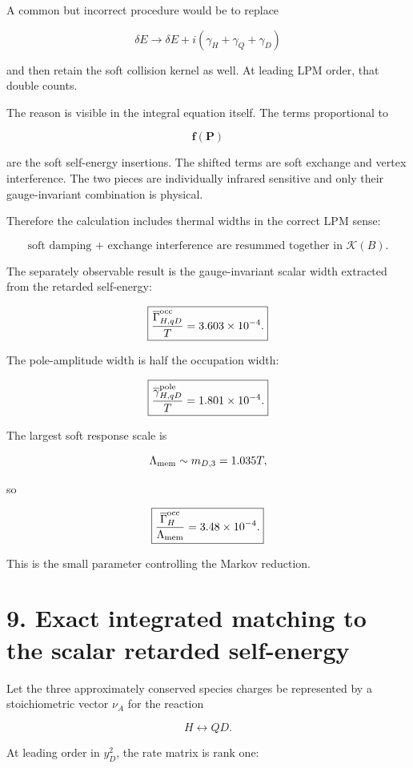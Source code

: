 \documentclass[
  10pt,
]{article}
\begin{document}
A common but incorrect procedure would be to replace

\[
\delta E
\rightarrow
\delta E+i(\gamma_H+\gamma_Q+\gamma_D)
\]

and then retain the soft collision kernel as well. At leading LPM order,
that double counts.

The reason is visible in the integral equation itself. The terms
proportional to

\[
\mathbf f(\mathbf P)
\]

are the soft self-energy insertions. The shifted terms are soft exchange
and vertex interference. The two pieces are individually infrared
sensitive and only their gauge-invariant combination is physical.

Therefore the calculation includes thermal widths in the correct LPM
sense:

\[
\boxed{
\text{soft damping + exchange interference are resummed together in }\mathcal K(B).
}
\]

The separately observable result is the gauge-invariant scalar width
extracted from the retarded self-energy:

\[
\boxed{
\frac{\overline\Gamma_{H,qD}^{\rm occ}}{T}
=3.603\times10^{-4}.
}
\]

The pole-amplitude width is half the occupation width:

\[
\boxed{
\frac{\overline\gamma_{H,qD}^{\rm pole}}{T}
=1.801\times10^{-4}.
}
\]

The largest soft response scale is

\[
\Lambda_{\rm mem}\sim m_{D,3}=1.035T,
\]

so

\[
\boxed{
\frac{\overline\Gamma_H^{\rm occ}}
{\Lambda_{\rm mem}}
=3.48\times10^{-4}.
}
\]

This is the small parameter controlling the Markov reduction.

\section{9. Exact integrated matching to the scalar retarded
self-energy}\label{exact-integrated-matching-to-the-scalar-retarded-self-energy}

Let the three approximately conserved species charges be represented by
a stoichiometric vector \(\nu_A\) for the reaction

\[
H\leftrightarrow QD.
\]

At leading order in \(y_D^2\), the rate matrix is rank one:
\end{document}
